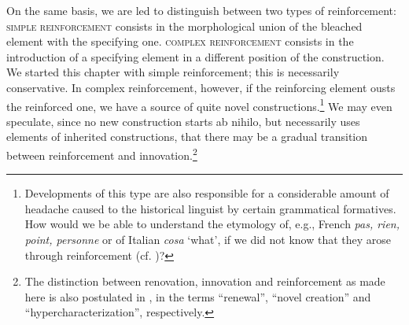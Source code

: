 On the same basis, we are led to distinguish between two types of reinforcement: \textsc{simple reinforcement} consists in the morphological union of the blea\-ched element with the specifying one. \textsc{complex reinforcement} consists in the introduction of a specifying element in a different position of the construction. We started this chapter with simple reinforcement; this is necessarily conservative. In complex reinforcement, however, if the reinforcing element ousts the reinforced one, we have a source of quite novel constructions.\footnote{Developments of this type are also responsible for a considerable amount of headache caused to the historical linguist by certain grammatical formatives. How would we be able to understand the etymology of, e.g., French \textit{pas, rien, point, personne} or of Italian \textit{cosa} ‘what’, if we did not know that they arose through reinforcement (cf. )?} We may even speculate, since no new construction starts ab nihilo, but necessarily uses elements of inherited constructions, that there may be a gradual transition between reinforcement and innovation.\footnote{The distinction between renovation, innovation and reinforcement as made here is also postulated in \citet[115]{Kahr1976}, in the terms ``renewal'', ``novel creation'' and ``hypercharacterization'', respectively.}
